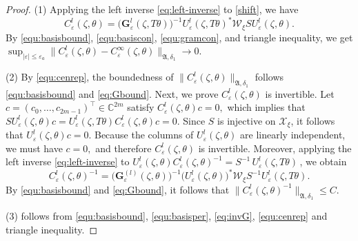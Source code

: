 \documentclass[reqno,11pt]{amsart}
\newcommand{\C}{{\mathbb C}}
\begin{document}
\begin{proof}
    (1) Applying the left inverse \eqref{eq:left-inverse} to \eqref{shift}, we have 
\begin{equation}\label{equ:cenrep}
    C_{\varepsilon}^{l}(\zeta,\theta)=\bigl(\mathbf{G}^{l}_\varepsilon(\zeta,T\theta)\bigr)^{-1}U_\varepsilon^{l}(\zeta,T\theta)^*\mathcal W_{\xi}SU_\varepsilon^{l}(\zeta,\theta).
\end{equation}
By  \eqref{equ:basisbound}, \eqref{equ:basiscon}, \eqref{equ:gramcon},  and triangle inequality, we get
  $\sup_{|\varepsilon|\leq \varepsilon_a}\bigl\|C_{\varepsilon}^{l}(\zeta,\theta)-C^{\infty}_\varepsilon(\zeta,\theta)\bigr\|_{\mathfrak A,\delta_1}\to0.$

(2) By \eqref{equ:cenrep},  the boundedness of $\|C_\varepsilon^{l}(\zeta,\theta)\|_{\mathfrak A,\delta_1}$ follows   \eqref{equ:basisbound} and \eqref{eq:Gbound}.
Next, we prove $C_\varepsilon^l(\zeta,\theta)$ is invertible.
Let
$
c=(c_0,\dots,c_{2m-1})^\top\in\C^{2m}
$
satisfy
$
C_\varepsilon^{l}(\zeta,\theta)c=0,
$
which implies that
$
SU_\varepsilon^{l}(\zeta,\theta)c=U_\varepsilon^{l}(\zeta,T\theta)C_\varepsilon^{l}(\zeta,\theta)c=0.
$
Since $S$ is injective on $\mathcal{X}_{\xi}$, it follows that
$
U_\varepsilon^{l}(\zeta,\theta)c=0.
$
Because the columns of $U_\varepsilon^{l}(\zeta,\theta)$ are linearly independent, we must have
$c=0,$
and therefore $C_\varepsilon^{l}(\zeta,\theta)$ is  invertible.
Moreover, applying the left inverse \eqref{eq:left-inverse} to  $ U_\varepsilon^l(\zeta,\theta) C_\varepsilon^l(\zeta,\theta)^{-1}=
S^{-1}\,U_\varepsilon^l(\zeta,T\theta)\,
$, we obtain $$C_\varepsilon^{l}(\zeta,\theta)^{-1}=\bigl(\mathbf G_\varepsilon^{(l)}(\zeta,\theta)\bigr)^{-1}
\bigl(U_\varepsilon^{l}(\zeta,\theta)\bigr)^*\mathcal W_{\xi}
S^{-1}
U_\varepsilon^{l}(\zeta,T\theta).$$ 
By  \eqref{equ:basisbound} and \eqref{eq:Gbound}, it follows that $\|C_\varepsilon^{l}(\zeta,\theta)^{-1}\|_{\mathfrak A,\delta_1}\leq C.$

(3) follows from  \eqref{equ:basisbound}, \eqref{equ:basisper}, \eqref{eq:invG}, \eqref{equ:cenrep}  and triangle inequality.




\end{proof}
\end{document}
